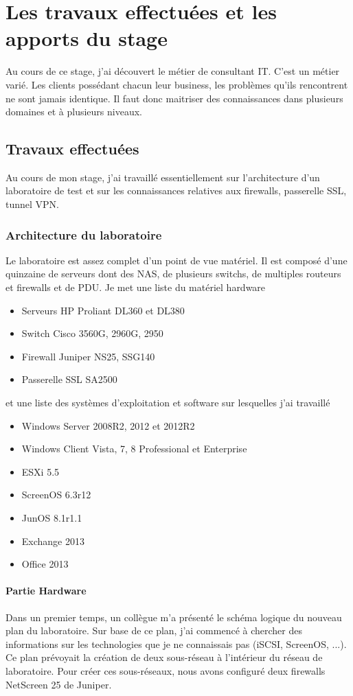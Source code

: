 \chapter{Les travaux effectuées et les apports du stage}
Au cours de ce stage, j'ai découvert le métier de consultant IT. 
C'est un métier varié.
Les clients possédant chacun leur business, les problèmes qu'ils rencontrent ne sont jamais identique.
Il faut donc maitriser des connaissances dans plusieurs domaines et à plusieurs niveaux.

\section{Travaux effectuées}
Au cours de mon stage, j'ai travaillé essentiellement sur l'architecture d'un laboratoire de test et sur les connaissances relatives aux firewalls, passerelle SSL, tunnel VPN.

\subsection{Architecture du laboratoire}
Le laboratoire est assez complet d'un point de vue matériel. 
Il est composé d'une quinzaine de serveurs dont des NAS, de plusieurs switchs, de multiples routeurs et firewalls et de PDU.
Je met une liste du matériel hardware
\begin{itemize}
	\item Serveurs HP Proliant DL360 et DL380
	\item Switch Cisco 3560G, 2960G, 2950
	\item Firewall Juniper NS25, SSG140
	\item Passerelle SSL SA2500
\end{itemize}
et une liste des systèmes d'exploitation et software sur lesquelles j'ai travaillé
\begin{itemize}
	\item Windows Server 2008R2, 2012 et 2012R2
	\item Windows Client Vista, 7, 8 Professional et Enterprise
	\item ESXi 5.5
	\item ScreenOS 6.3r12
	\item JunOS 8.1r1.1
	\item Exchange 2013
	\item Office 2013
\end{itemize}

\subsubsection{Partie Hardware}
Dans un premier temps, un collègue m'a présenté le schéma logique du nouveau plan du laboratoire.
Sur base de ce plan, j'ai commencé à chercher des informations sur les technologies que je ne connaissais pas (iSCSI, ScreenOS, ...).
Ce plan prévoyait la création de deux sous-réseau à l'intérieur du réseau de laboratoire.
Pour créer ces sous-réseaux, nous avons configuré deux firewalls NetScreen 25 de Juniper. 

